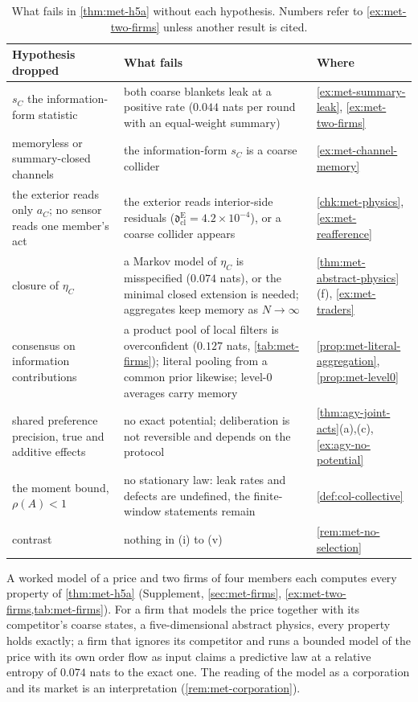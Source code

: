 \begin{table}[t]
\centering\small
\caption{What fails in \cref{thm:met-h5a} without each hypothesis. Numbers refer to \cref{ex:met-two-firms} unless another result is cited.}
\label{tab:met-hypotheses}
\begin{tabular}{@{}>{\raggedright\arraybackslash}p{}>{\raggedright\arraybackslash}p{}>{\raggedright\arraybackslash}p{}@{}}
\toprule
Hypothesis dropped & What fails & Where\\
\midrule
$s_C$ the information-form statistic & both coarse blankets leak at a positive rate ($0.044$ nats per round with an equal-weight summary) & \cref{ex:met-summary-leak}, \cref{ex:met-two-firms}\\
memoryless or summary-closed channels & the information-form $s_C$ is a coarse collider & \cref{ex:met-channel-memory}\\
the exterior reads only $a_C$; no sensor reads one member's act & the exterior reads interior-side residuals ($\mathfrak d^{\mathrm E}_{\mathrm{cl}}=4.2\times10^{-4}$), or a coarse collider appears & \cref{chk:met-physics}, \cref{ex:met-reafference}\\
closure of $\eta_C$ & a Markov model of $\eta_C$ is misspecified ($0.074$ nats), or the minimal closed extension is needed; aggregates keep memory as $N\to\infty$ & \cref{thm:met-abstract-physics}(f), \cref{ex:met-traders}\\
consensus on information contributions & a product pool of local filters is overconfident ($0.127$ nats, \cref{tab:met-firms}); literal pooling from a common prior likewise; level-0 averages carry memory & \cref{prop:met-literal-aggregation}, \cref{prop:met-level0}\\
shared preference precision, true and additive effects & no exact potential; deliberation is not reversible and depends on the protocol & \cref{thm:agy-joint-acts}(a),(c), \cref{ex:agy-no-potential}\\
the moment bound, $\rho(A)<1$ & no stationary law: leak rates and defects are undefined, the finite-window statements remain & \cref{def:col-collective}\\
contrast & nothing in (i) to (v) & \cref{rem:met-no-selection}\\
\bottomrule
\end{tabular}
\end{table}

A worked model of a price and two firms of four members each computes every property of \cref{thm:met-h5a} (Supplement, \cref{sec:met-firms}, \cref{ex:met-two-firms,tab:met-firms}). For a firm that models the price together with its competitor's coarse states, a five-dimensional abstract physics, every property holds exactly; a firm that ignores its competitor and runs a bounded model of the price with its own order flow as input claims a predictive law at a relative entropy of $0.074$ nats to the exact one. The reading of the model as a corporation and its market is an interpretation (\cref{rem:met-corporation}).

